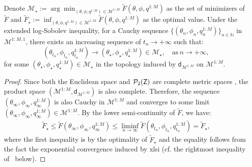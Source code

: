 \begin{lemma}\label{lem:cauchy}
    Denote $\mathcal{M}_\star := \arg\min_{(\theta, \phi, q^{1:M}) \in \mathcal{M}^{1:M}} \tilde{F}(\theta, \phi, q^{1:M})$ as the set of minimizers of $\tilde{F}$ and $\tilde{F}_\star := \inf_{(\theta, \phi, q^{1:M}) \in \mathcal{M}^{1:M}} \tilde{F}(\theta, \phi, q^{1:M})$ as the optimal value. Under the extended log-Sobolev inequality, for a Cauchy sequence $\{(\theta_n, \phi_n, q_n^{1:M})\}_{n\in \mathbb{N}}$ in $\mathcal{M}^{1:M,1}$, there exists an increasing sequence of $t_n \to +\infty$ such that:
    \begin{equation*}
        (\theta_{t_n}, \phi_{t_n}, q_{t_n}^{1:M}) \to (\theta_\star, \phi_\star, q_\star^{1:M}) \in \mathcal{M}_\star, \quad \text{as} \ n \to +\infty,
    \end{equation*}
    for some $(\theta_\star, \phi_\star, q_\star^{1:M}) \in \mathcal{M}_\star$ in the topology induced by $\mathsf{d}_{\mathcal{M}^{1:M}}$ on $\mathcal{M}^{1:M}$.
\end{lemma}
\begin{proof}
    Since both the Euclidean space and $\mathcal{P}_2({\mathsf{Z}})$ are complete metric spaces \citep[Theorem 6.18]{villani2008optimal}, the product space $(\mathcal{M}^{1:M}, \mathsf{d}_{\mathcal{M}^{1:M}})$ is also complete. Therefore, the sequence $(\theta_\infty, \phi_\infty, q_\infty^{1:M})$ is also Cauchy in $\mathcal{M}^{1:M}$ and converges to some limit $(\theta_\infty, \phi_\infty, q_\infty^{1:M}) \in \mathcal{M}^{1:M}$. By the lower semi-continuity of $\tilde{F}$, we have:
    \begin{align*}
        \tilde{F}_\star \leq \tilde{F}(\theta_\infty, \phi_\infty, q_\infty^{1:M}) \leq \liminf_{n\to\infty} \tilde{F}(\theta_{t_n}, \phi_{t_n}, q_{t_n}^{1:M}) = \tilde{F}_\star,
    \end{align*}
    where the first inequality is by the optimality of $\tilde{F}_\star$ and the equality follows from the fact the exponential convergence induced by \gls*{xlsi} (cf. the rightmost inequality of~ below).
\end{proof}

